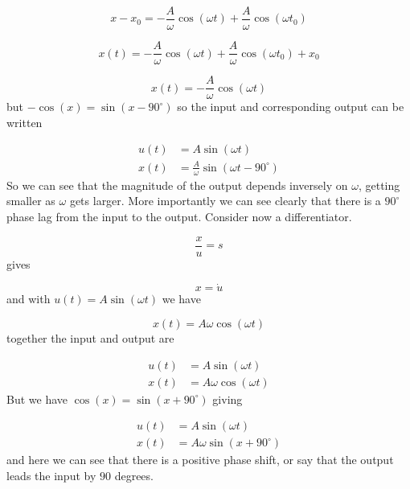\begin{equation*}
  x-x_{0}=-\frac{A}{\omega}\cos(\omega t)+\frac{A}{\omega}\cos(\omega t_{0})
\end{equation*}

\begin{equation*}
  x(t)=-\frac{A}{\omega}\cos(\omega t)+\frac{A}{\omega}\cos(\omega t_{0})+x_{0}
\end{equation*}

\begin{equation*}
  x(t)=-\frac{A}{\omega}\cos(\omega t)
\end{equation*}
but $-\cos(x)=\sin(x-90^{\circ})$ so the input and corresponding output can be written

\begin{equation*}
  \begin{split}
    u(t)&=A\sin(\omega t) \\
    x(t)&=\frac{A}{\omega}\sin(\omega t-90^{\circ})
  \end{split}
\end{equation*}
So we can see that the magnitude of the output depends inversely on $\omega$, getting smaller as $\omega$ gets larger.
More importantly we can see clearly that there is a $90^{\circ}$ phase lag from the input to the output.
Consider now a differentiator.

\begin{equation*}
  \frac{x}{u}=s
\end{equation*}
gives

\begin{equation*}
  x=\dot{u}
\end{equation*}
and with $u(t)=A\sin(\omega t)$ we have

\begin{equation*}
  x(t)=A\omega\cos(\omega t)
\end{equation*}
together the input and output are

\begin{equation*}
  \begin{split}
    u(t)&=A\sin(\omega t) \\
    x(t)&=A\omega\cos(\omega t)
  \end{split}
\end{equation*}
But we have $\cos(x)=\sin(x+90^{\circ})$ giving

\begin{equation*}
  \begin{split}
    u(t)&=A\sin(\omega t) \\
    x(t)&=A\omega\sin(x+90^{\circ})
  \end{split}
\end{equation*}
and here we can see that there is a positive phase shift, or say that the output leads the input by $90$ degrees.

